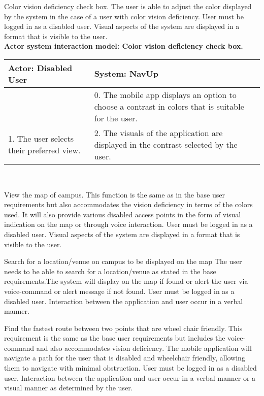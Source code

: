 \FuncReq
{Color vision deficiency check box.}
{The user is able to adjust the color displayed by the system in the case of a user with color vision deficiency.}
{User must be logged in as a disabled user.}
{Visual aspects of the system are displayed in a format that is visible to the user.}
    \\
    \textbf{Actor system interaction model: Color vision deficiency check box.}\\
    \begin{tabular}{ | p{6cm} | p{6cm} |}
    \hline
    Actor: Disabled User & System: NavUp \\ \hline
     & 0. The mobile app displays an option to choose a contrast in colors that is suitable for the user.\\ \hline
    1. The user selects their preferred view. & 2. The visuals of the application are displayed in the contrast selected by the user.\\ \hline   
    \end{tabular}
\\
\bigskip

\FuncReq
{View the map of campus.}
{This function is the same as in the base user requirements but also accommodates the vision deficiency in terms of the colors used. It will also provide various disabled access points in the form of visual indication on the map or through voice interaction.}
{User must be logged in as a disabled user.}
{Visual aspects of the system are displayed in a format that is visible to the user.}

\FuncReq
{Search for a location/venue on campus to be displayed on the map}
{The user needs to be able to search for a location/venue as stated in the base requirements.The system will display on the map if found or alert the user via voice-command or alert message if not found.}
{User must be logged in as a disabled user.}
{Interaction between the application and user occur in a verbal manner.}

\FuncReq
{Find the fastest route between two points that are wheel chair friendly.}%
{This requirement is the same as the base user requirements but includes the voice-command and also accommodates vision deficiency. The mobile application will navigate a path for the user that is disabled and wheelchair friendly, allowing them to navigate with minimal obstruction.}
{User must be logged in as a disabled user.}
{Interaction between the application and user occur in a verbal manner or a visual manner as determined by the user.}

